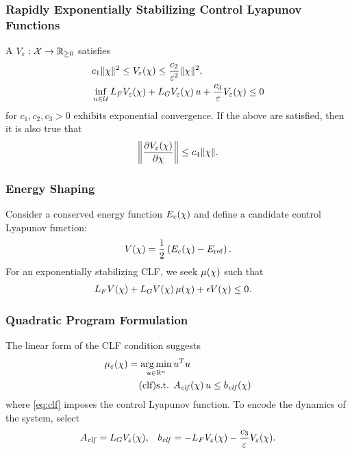 \begin{frame}
  \frametitle{Rapidly Exponentially Stabilizing Control Lyapunov Functions}
  A 
  $V_{\varepsilon} : \mathcal{X} \to \mathbb{R}_{\geq 0}$ satisfies
  \begin{align*}
    &c_{1} \|\chi\|^{2} \leq V_{\varepsilon}(\chi) \leq \frac{c_{2}}{\varepsilon^{2}} \|\chi\|^{2},\\
    &\inf_{u \in \mathcal{U}} L_{F}V_{\varepsilon}(\chi) + L_{G}V_{\varepsilon}(\chi) \, u +
    \frac{c_{3}}{\varepsilon} V_{\varepsilon}(\chi) \leq 0
  \end{align*}
  for $c_{1}, c_{2}, c_{3} > 0$ exhibits exponential convergence. If the above
  are satisfied, then it is also true that
  \begin{align*}
    \left\| \frac{\partial{V_{\varepsilon}(\chi)}}{\partial{\chi}} \right\| \leq c_{4} \|\chi\|.
  \end{align*}
\end{frame}

\begin{frame}
  \frametitle{Energy Shaping}
  Consider a conserved energy function $E_{c}(\chi)$ and define a candidate
  control Lyapunov function:
  \begin{align*}
    V(\chi) = \frac{1}{2} \left(E_{c}(\chi) - E_{\mathrm{ref}}\right).
  \end{align*}
  For an exponentially stabilizing CLF, we seek $\mu(\chi)$ such that
  \begin{align*}
    L_{F} V(\chi) + L_{G} V(\chi) \, \mu(\chi) + \epsilon V(\chi) &\leq 0.
  \end{align*}
\end{frame}

\begin{frame}[t]
  \frametitle{Quadratic Program Formulation}
  The linear form of the CLF condition suggests
  \begin{align}
    \nonumber
    \mueps\arx = \argmin_{\uu \in \R^{n}}  \, & \uu^T \uu\\
    \label{eq:clf} \tag{clf}
    \mbox{s.t. } & \Aclf\arx \, \uu \leq \bclf\arx%
  \end{align}
  where \eqref{eq:clf} imposes the control Lyapunov function. To encode the dynamics of the system, select
  \begin{align*}
    A_{\mathit{clf}} = L_{G}V_{\varepsilon}(\chi), && b_{\mathit{clf}} = -L_{F}V_{\varepsilon}(\chi) - \frac{c_{3}}{\varepsilon} V_{\varepsilon}(\chi).
  \end{align*}
\end{frame}

